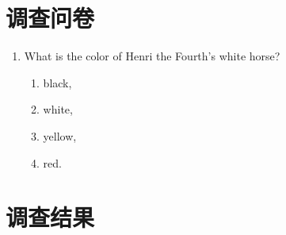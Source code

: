\section{调查问卷}

\begin{enumerate}
\item What is the color of Henri the Fourth’s white horse?
  \begin{enumerate}
  \item black,
  \item white,
  \item yellow,
  \item red.
  \end{enumerate}
\end{enumerate}

\section{调查结果}
